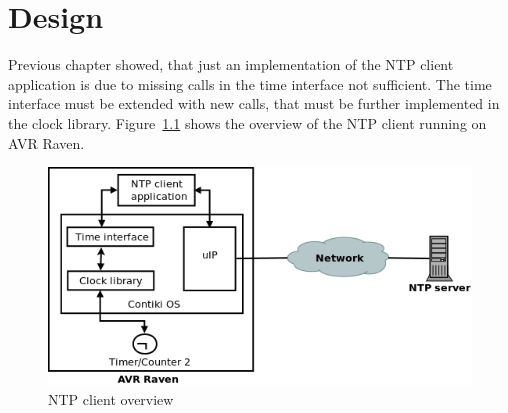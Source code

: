 
\chapter{Design}
Previous chapter showed, that just an implementation of the
NTP client application is due to missing calls in the time interface not sufficient.
The time interface must be extended with new calls,
that must be further implemented in the clock library.
Figure~\ref{fig:design-overview} shows the overview of the NTP client running on AVR Raven.

\begin{figure}[H]
  \centering
  \includegraphics[width=13cm,keepaspectratio]{fig/design.png}
  \caption{NTP client overview} %
  \label{fig:design-overview} %
\end{figure}





%


